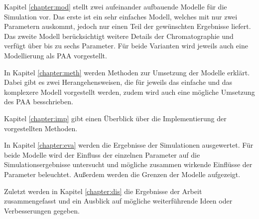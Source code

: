 Kapitel \ref{chapter:mod} stellt zwei aufeinander aufbauende Modelle für die Simulation vor. Das erste ist ein sehr einfaches Modell, welches mit nur zwei Parametern auskommt, jedoch nur einen Teil der gewünschten Ergebnisse liefert. Das zweite Modell berücksichtigt weitere Details der Chromatographie und verfügt über bis zu sechs Parameter. Für beide Varianten wird jeweils auch eine Modellierung als PAA vorgestellt.

In Kapitel \ref{chapter:meth} werden Methoden zur Umsetzung der Modelle erklärt. Dabei gibt es zwei Herangehensweisen, die für jeweils das einfache und das komplexere Modell vorgestellt werden, zudem wird auch eine mögliche Umsetzung des PAA besschrieben.

Kapitel \ref{chapter:imp} gibt einen Überblick über die Implementierung der vorgestellten Methoden. 

In Kapitel \ref{chapter:eva} werden die Ergebnisse der Simulationen ausgewertet. Für beide Modelle wird der Einfluss der einzelnen Parameter auf die Simulationsergebnisse untersucht und mögliche zusammen wirkende Einflüsse der Parameter beleuchtet. Außerdem werden die Grenzen der Modelle aufgezeigt.

Zuletzt werden in Kapitel \ref{chapter:dis} die Ergebnisse der Arbeit zusammengefasst und ein Ausblick auf mögliche weiterführende Ideen oder Verbesserungen gegeben.